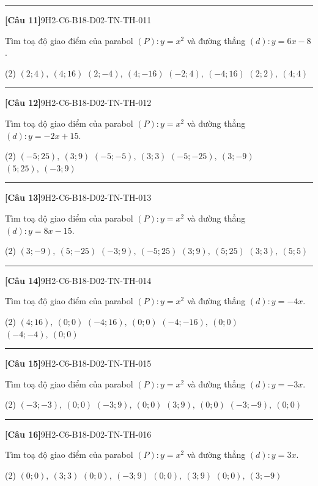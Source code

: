 \documentclass[12pt,a4paper]{article}
\newif\ifloigiai
\newenvironment{cauhoi}[2]{%
  \par\medskip\noindent\rule{\textwidth}{0.4pt}\par\nopagebreak
  \noindent\textbf{[#1]}\hfill{\scriptsize\ttfamily #2}\par\nopagebreak\smallskip}{\par}
\newcommand{\dapan}[1]{\ifloigiai\par\smallskip\noindent\textit{Đáp án:} \textbf{#1}\par\fi}
\begin{document}
\begin{cauhoi}{Câu 11}{9H2-C6-B18-D02-TN-TH-011}
Tìm toạ độ giao điểm của parabol $(P): y=x^{2}$ và đường thẳng $(d): y=6x-8$.
\begin{tasks}(2)
\task $(2;4),\ (4;16)$
\task $(2;-4),\ (4;-16)$
\task $(-2;4),\ (-4;16)$
\task $(2;2),\ (4;4)$
\end{tasks}
\dapan{A}
\end{cauhoi}
\begin{cauhoi}{Câu 12}{9H2-C6-B18-D02-TN-TH-012}
Tìm toạ độ giao điểm của parabol $(P): y=x^{2}$ và đường thẳng $(d): y=-2x+15$.
\begin{tasks}(2)
\task $(-5;25),\ (3;9)$
\task $(-5;-5),\ (3;3)$
\task $(-5;-25),\ (3;-9)$
\task $(5;25),\ (-3;9)$
\end{tasks}
\dapan{A}
\end{cauhoi}
\begin{cauhoi}{Câu 13}{9H2-C6-B18-D02-TN-TH-013}
Tìm toạ độ giao điểm của parabol $(P): y=x^{2}$ và đường thẳng $(d): y=8x-15$.
\begin{tasks}(2)
\task $(3;-9),\ (5;-25)$
\task $(-3;9),\ (-5;25)$
\task $(3;9),\ (5;25)$
\task $(3;3),\ (5;5)$
\end{tasks}
\dapan{C}
\end{cauhoi}
\begin{cauhoi}{Câu 14}{9H2-C6-B18-D02-TN-TH-014}
Tìm toạ độ giao điểm của parabol $(P): y=x^{2}$ và đường thẳng $(d): y=-4x$.
\begin{tasks}(2)
\task $(4;16),\ (0;0)$
\task $(-4;16),\ (0;0)$
\task $(-4;-16),\ (0;0)$
\task $(-4;-4),\ (0;0)$
\end{tasks}
\dapan{B}
\end{cauhoi}
\begin{cauhoi}{Câu 15}{9H2-C6-B18-D02-TN-TH-015}
Tìm toạ độ giao điểm của parabol $(P): y=x^{2}$ và đường thẳng $(d): y=-3x$.
\begin{tasks}(2)
\task $(-3;-3),\ (0;0)$
\task $(-3;9),\ (0;0)$
\task $(3;9),\ (0;0)$
\task $(-3;-9),\ (0;0)$
\end{tasks}
\dapan{B}
\end{cauhoi}
\begin{cauhoi}{Câu 16}{9H2-C6-B18-D02-TN-TH-016}
Tìm toạ độ giao điểm của parabol $(P): y=x^{2}$ và đường thẳng $(d): y=3x$.
\begin{tasks}(2)
\task $(0;0),\ (3;3)$
\task $(0;0),\ (-3;9)$
\task $(0;0),\ (3;9)$
\task $(0;0),\ (3;-9)$
\end{tasks}
\dapan{C}
\end{cauhoi}
\end{document}
